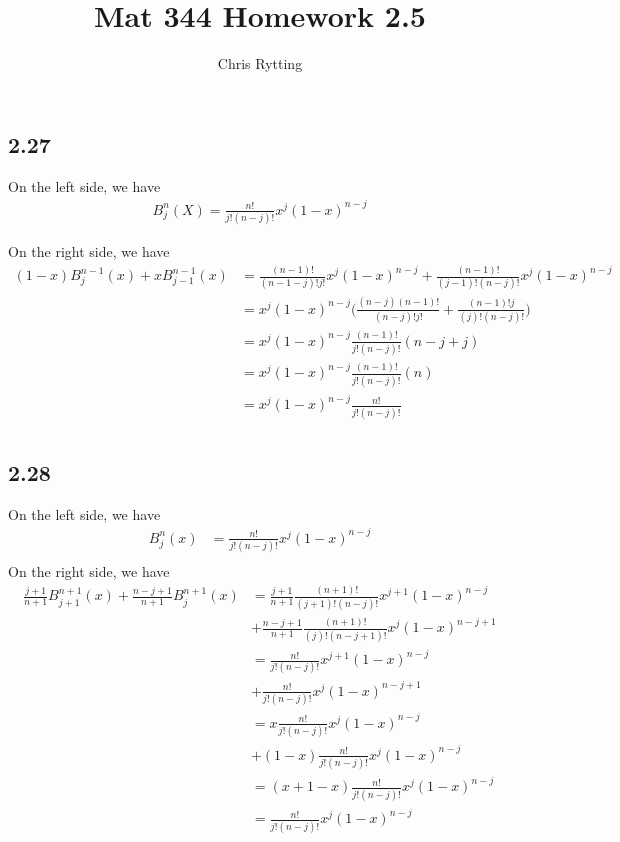\documentclass[letterpaper,12pt]{article}
\theoremstyle{definition}
\begin{document}
\title{Mat 344 Homework 2.5}
\author{Chris Rytting}
\maketitle

\subsection*{2.27}
On the left side, we have
\begin{align*}
    B^n_j(X) = \frac{n!}{j!(n-j)!}x^j(1-x)^{n-j}
\end{align*}

On the right side, we have
\begin{align*}
    (1-x)B^{n-1}_j(x) + xB^{n-1}_{j-1}(x) &= \frac{(n-1)!}{(n-1-j)! j!}x^j (1-x)^{n-j} + \frac{(n-1)!}{(j-1)!(n-j)!} x^j(1-x)^{n-j} \\
    &= x^j(1-x)^{n-j}  \Big( \frac{(n-j)(n-1)!}{(n-j)! j!} + \frac{(n-1)!j}{(j)!(n-j)!} \Big)  \\
    &= x^j(1-x)^{n-j} \frac{(n-1)!}{j!(n-j)!} (n-j+j)\\
    &= x^j(1-x)^{n-j} \frac{(n-1)!}{j!(n-j)!} (n)\\
    &= x^j(1-x)^{n-j} \frac{n!}{j!(n-j)!}\\ \end{align*}

\subsection*{2.28}
On the left side, we have
\begin{align*}
    B_j^n(x) &= \frac{n!}{j!(n-j)!}x^j(1-x)^{n-j} \\
\end{align*}
On the right side, we have
\begin{align*}
    \frac{j+1}{n+1}B^{n+1}_{j+1} (x) + \frac{n-j+1}{n+1}B^{n+1}_j(x) &= \frac{j+1}{n+1}\frac{(n+1)!}{(j+1)!(n-j)!}x^{j+1}(1-x)^{n-j}\\ &+ \frac{n-j+1}{n+1}\frac{(n+1)!}{(j)!(n-j+1)!}x^{j}(1-x)^{n-j+1} \\
    &= \frac{n!}{j!(n-j)!}x^{j+1}(1-x)^{n-j} \\&+ \frac{n!}{j!(n-j)!}x^{j}(1-x)^{n-j+1} \\
    &= x\frac{n!}{j!(n-j)!}x^{j}(1-x)^{n-j} \\&+ (1-x) \frac{n!}{j!(n-j)!}x^{j}(1-x)^{n-j} \\
    &= (x+1-x)\frac{n!}{j!(n-j)!}x^{j}(1-x)^{n-j} \\
    &= \frac{n!}{j!(n-j)!}x^{j}(1-x)^{n-j} \\
\end{align*}
\end{document}
